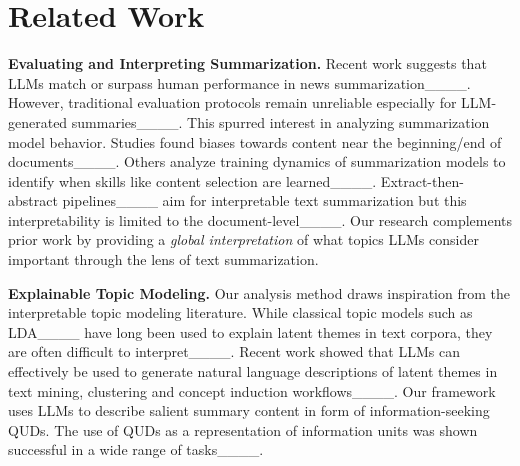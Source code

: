 \section{Related Work}
\textbf{Evaluating and Interpreting Summarization.}
Recent work suggests that LLMs match or surpass human performance in news summarization____.
However, traditional evaluation protocols remain unreliable especially for LLM-generated summaries____.
This spurred interest in analyzing summarization model behavior.
Studies found biases towards content near the beginning/end of documents____.
Others analyze training dynamics of summarization models to identify when skills like content selection are learned____.
Extract-then-abstract pipelines____ aim for interpretable text summarization but this interpretability is limited to the document-level____.
Our research complements prior work by providing a \emph{global interpretation} of what topics LLMs consider important through the lens of text summarization.

\textbf{Explainable Topic Modeling.}
Our analysis method draws inspiration from the interpretable topic modeling literature.
While classical topic models such as LDA____ have long been used to explain latent themes in text corpora, they are often difficult to interpret____.
Recent work showed that LLMs can effectively be used to generate natural language descriptions of latent themes in text mining, clustering and concept induction workflows____.
Our framework uses LLMs to describe salient summary content in form of information-seeking QUDs.
The use of QUDs as a representation of information units was shown successful in a wide range of tasks____.